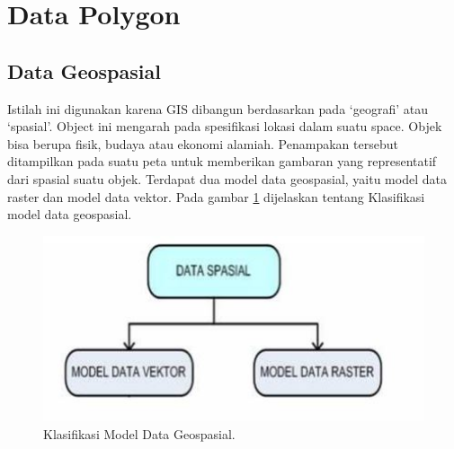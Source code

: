 \section{Data Polygon}
\subsection{Data Geospasial}
Istilah ini digunakan karena GIS dibangun berdasarkan pada ‘geografi’ atau ‘spasial’. Object ini mengarah pada spesifikasi lokasi dalam suatu space. Objek bisa berupa fisik, budaya atau ekonomi alamiah. Penampakan tersebut ditampilkan pada suatu peta untuk memberikan gambaran yang representatif dari spasial suatu objek.
Terdapat dua model data geospasial, yaitu model data raster dan model data vektor. 
Pada gambar \ref{datageospasial} dijelaskan tentang Klasifikasi model data geospasial.
\begin{figure}[ht]
	\centerline{\includegraphics[width=1\textwidth]{figures/datageospasial.JPG}}
	\caption{Klasifikasi Model Data Geospasial.}
	\label{datageospasial}
	\end{figure}

